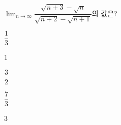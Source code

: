 $\displaystyle\lim_{n\to\infty}\dfrac{\sqrt{n+3}-\sqrt{n}}{\sqrt{n+2}-\sqrt{n+1}}$의 값은?
\begin{choices32}{\rule[-3ex]{0pt}{8ex}$\dfrac{1}{3}$}{\rule[-3ex]{0pt}{8ex}$1$}{\rule[-3ex]{0pt}{8ex}$\dfrac{3}{2}$}{\rule[-3ex]{0pt}{8ex}$\dfrac{7}{3}$}{\rule[-3ex]{0pt}{8ex}$3$}\end{choices32}

